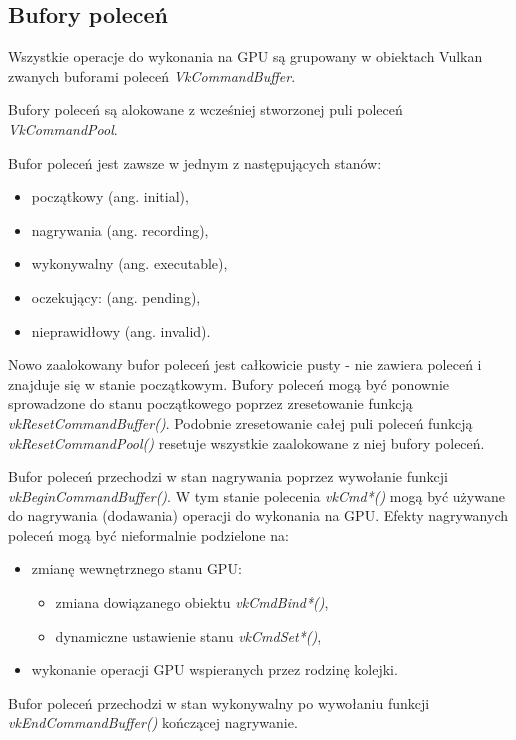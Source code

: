 \subsection{Bufory poleceń}

Wszystkie operacje do wykonania na GPU są grupowany w obiektach Vulkan zwanych buforami poleceń \textit{VkCommandBuffer}.

Bufory poleceń są alokowane z wcześniej stworzonej puli poleceń \textit{VkCommandPool}.

Bufor poleceń jest zawsze w jednym z następujących stanów:
\begin{itemize}
	\item początkowy (ang. initial),
	\item nagrywania (ang. recording),
	\item wykonywalny (ang. executable),
	\item oczekujący: (ang. pending),
	\item nieprawidłowy (ang. invalid).
\end{itemize}

Nowo zaalokowany bufor poleceń jest całkowicie pusty - nie zawiera poleceń i znajduje się w stanie początkowym.
Bufory poleceń mogą być ponownie sprowadzone do stanu początkowego poprzez zresetowanie funkcją \textit{vkResetCommandBuffer()}.
Podobnie zresetowanie całej puli poleceń funkcją \textit{vkResetCommandPool()} resetuje wszystkie zaalokowane z niej bufory poleceń.

Bufor poleceń przechodzi w stan nagrywania poprzez wywołanie funkcji \textit{vkBeginCommandBuffer()}.
W tym stanie polecenia \textit{vkCmd*()} mogą być używane do nagrywania (dodawania) operacji do wykonania na GPU.
Efekty nagrywanych poleceń mogą być nieformalnie podzielone na:
\begin{itemize}
	\item zmianę wewnętrznego stanu GPU:
	\begin{itemize}
		\item zmiana dowiązanego obiektu \textit{vkCmdBind*()},
		\item dynamiczne ustawienie stanu \textit{vkCmdSet*()},
	\end{itemize}
	\item wykonanie operacji GPU wspieranych przez rodzinę kolejki.
\end{itemize}


Bufor poleceń przechodzi w stan wykonywalny po wywołaniu funkcji \textit{vkEndCommandBuffer()} kończącej nagrywanie.

